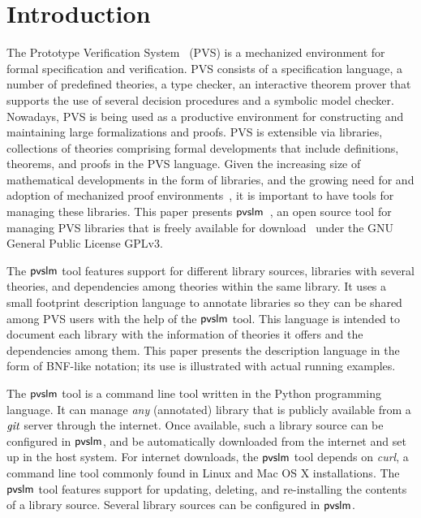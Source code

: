\section{Introduction}
\label{sec.intro}

The Prototype Verification System~\cite{pvs-cade92} (PVS) is a
mechanized environment for formal specification and verification.  PVS
consists of a specification language, a number of predefined theories,
a type checker, an interactive theorem prover that supports the use of
several decision procedures and a symbolic model checker.  Nowadays,
PVS is being used as a productive environment for constructing and
maintaining large formalizations and proofs. PVS is extensible via
libraries, collections of theories comprising formal developments that
include definitions, theorems, and proofs in the PVS language. Given
the increasing size of mathematical developments in the form of
libraries, and the growing need for and adoption of mechanized proof
environments~\cite{avigad-mech14,hales-proofs14}, it is important to
have tools for managing these libraries. This paper presents
$\textsf{pvslm}$~\cite{pvslm}, an open source tool for managing PVS libraries
that is freely available for download~\cite{pvslm} under the GNU
General Public License GPLv3.

The $\textsf{pvslm}$ tool features support for different library sources,
libraries with several theories, and dependencies among theories
within the same library. It uses a small footprint description
language to annotate libraries so they can be shared among PVS users
with the help of the $\textsf{pvslm}$ tool. This language is intended to
document each library with the information of theories it offers and
the dependencies among them. This paper presents the description
language in the form of BNF-like notation; its use is illustrated with
actual running examples.

The $\textsf{pvslm}$ tool is a command line tool written in the Python
programming language. It can manage {\em any} (annotated) library that
is publicly available from a $\textit{git}$ server through the internet.  Once
available, such a library source can be configured in $\textsf{pvslm}$, and be
automatically downloaded from the internet and set up in the host
system. For internet downloads, the $\textsf{pvslm}$ tool depends on {\em
  curl}, a command line tool commonly found in Linux and Mac OS X
installations. The $\textsf{pvslm}$ tool features support for updating,
deleting, and re-installing the contents of a library source.  Several
library sources can be configured in $\textsf{pvslm}$.

